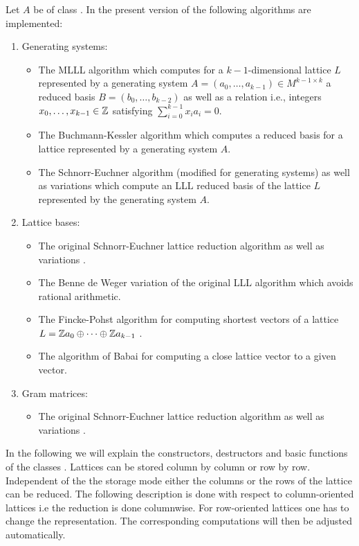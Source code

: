 Let $A$ be of class .  In the present version of \LiDIA the following
algorithms are implemented:
\begin{enumerate}
\item Generating systems:
  \begin{itemize}
  \item The MLLL algorithm \cite{Pohst/Zassenhaus:1989} which computes for a $k-1$-dimensional
    lattice $L$ represented by a generating system $A = (a_0, \dots, a_{k-1}) \in M^{k-1 \times
      k}$ a reduced basis $B = (b_0, \dots, b_{k-2})$ as well as a relation i.e., integers $x_0,
    \dots , x_{k-1} \in \mathbb{Z}$ satisfying $\sum_{i=0}^{k-1} x_i a_i =0$.
  \item The Buchmann-Kessler algorithm \cite{Buchmann/Kessler:1992} which computes a reduced
    basis for a lattice represented by a generating system $A$.
  \item The Schnorr-Euchner algorithm \cite{Schnorr/Euchner:1994} (modified for generating
    systems) as well as variations \cite{Wetzel/Backes:2000} which compute an LLL reduced basis
    of the lattice $L$ represented by the generating system $A$.
  \end{itemize}
\item Lattice bases:
  \begin{itemize}
  \item The original Schnorr-Euchner lattice reduction algorithm \cite{Schnorr/Euchner:1994} as
    well as variations \cite{Wetzel/Backes:2000}.
  \item The Benne de Weger variation \cite{dWeger:1989} of the original LLL algorithm
    \cite{LenstraAK/LenstraHW/Lovasz:1982} which avoids rational arithmetic.
  \item The Fincke-Pohst algorithm for computing shortest vectors of a lattice $L = \mathbb{Z} a_0
    \oplus \dots \oplus \mathbb{Z} a_{k-1}$ \cite{Fincke/Pohst:1985}.
  \item The algorithm of Babai \cite{Babai:1986} for computing a close lattice vector to a given
    vector.
  \end{itemize}
\item Gram matrices:
  \begin{itemize}
  \item The original Schnorr-Euchner lattice reduction algorithm \cite{Schnorr/Euchner:1994} as
    well as variations \cite{Wetzel/Backes:2000}.
  \end{itemize}
\end{enumerate}
In the following we will explain the constructors, destructors and basic functions of the
classes .  Lattices can be stored column by column or row by row.
Independent of the the storage mode either the columns or the rows of the lattice can be
reduced.  The following description is done with respect to column-oriented lattices i.e the
reduction is done columnwise.  For row-oriented lattices one has to change the representation.
The corresponding computations will then be adjusted automatically.


